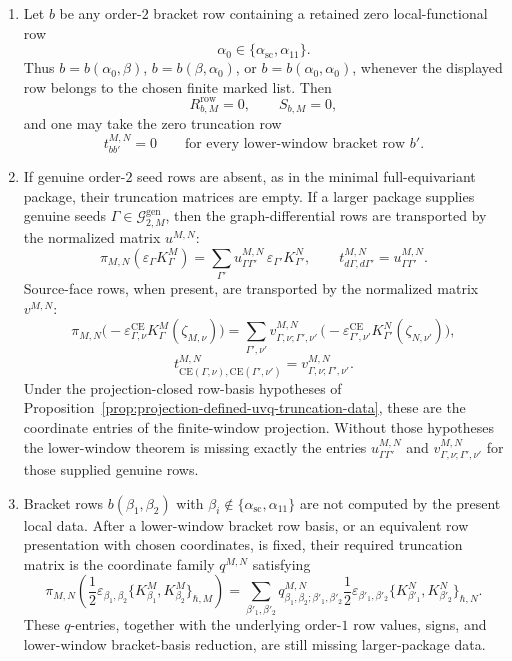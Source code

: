 \begin{prop}
\begin{enumerate}[label=(T\arabic*)]
    \item Let \(b\) be any order-\(2\) bracket row containing a retained
    zero local-functional row
    \[
      \alpha_0\in\{\alpha_{\mathrm{sc}},\alpha_{11}\}.
    \]
    Thus \(b=b(\alpha_0,\beta)\), \(b=b(\beta,\alpha_0)\), or
    \(b=b(\alpha_0,\alpha_0)\), whenever the displayed row belongs to the
    chosen finite marked list.  Then
    \[
      R^{\mathrm{row}}_{b,M}=0,\qquad S_{b,M}=0,
    \]
    and one may take the zero truncation row
    \[
      t^{M,N}_{bb'}=0
      \qquad
      \text{for every lower-window bracket row }b'.
    \]

    \item If genuine order-\(2\) seed rows are absent, as in the minimal
    full-equivariant package, their truncation matrices are empty.  If a
    larger package supplies genuine seeds
    \(\Gamma\in\mathcal G^{\mathrm{gen}}_{2,M}\), then the graph-differential
    rows are transported by the normalized matrix \(u^{M,N}\):
    \[
      \pi_{M,N}(\varepsilon_\Gamma K^M_\Gamma)
        =
      \sum_{\Gamma'}
        u^{M,N}_{\Gamma\Gamma'}\,
        \varepsilon_{\Gamma'}K^N_{\Gamma'},
      \qquad
      t^{M,N}_{d\Gamma,d\Gamma'}=u^{M,N}_{\Gamma\Gamma'}.
    \]
    Source-face rows, when present, are transported by the normalized matrix
    \(v^{M,N}\):
    \[
      \pi_{M,N}
      \bigl(-\varepsilon^{\mathrm{CE}}_{\Gamma,\nu}
      K^M_\Gamma(\zeta_{M,\nu})\bigr)
        =
      \sum_{\Gamma',\nu'}
        v^{M,N}_{\Gamma,\nu;\Gamma',\nu'}\,
        \bigl(-\varepsilon^{\mathrm{CE}}_{\Gamma',\nu'}
        K^N_{\Gamma'}(\zeta_{N,\nu'})\bigr),
    \]
    \[
      t^{M,N}_{\mathrm{CE}(\Gamma,\nu),
        \mathrm{CE}(\Gamma',\nu')}
        =
      v^{M,N}_{\Gamma,\nu;\Gamma',\nu'}.
    \]
    Under the projection-closed row-basis hypotheses of
    Proposition~\ref{prop:projection-defined-uvq-truncation-data}, these are
    the coordinate entries of the finite-window projection.  Without those
    hypotheses the lower-window theorem is missing exactly the entries
    \(u^{M,N}_{\Gamma\Gamma'}\) and
    \(v^{M,N}_{\Gamma,\nu;\Gamma',\nu'}\) for those supplied genuine rows.

    \item Bracket rows \(b(\beta_1,\beta_2)\) with
    \(\beta_i\notin\{\alpha_{\mathrm{sc}},\alpha_{11}\}\) are not computed
    by the present local data.  After a lower-window bracket row basis, or
    an equivalent row presentation with chosen coordinates, is fixed, their
    required truncation matrix is the coordinate family \(q^{M,N}\)
    satisfying
    \[
      \pi_{M,N}\!\left(
        \frac12\varepsilon_{\beta_1,\beta_2}
        \{K^M_{\beta_1},K^M_{\beta_2}\}_{\hbar,M}\right)
       =
      \sum_{\beta'_1,\beta'_2}
        q^{M,N}_{\beta_1,\beta_2;\beta'_1,\beta'_2}
        \frac12\varepsilon_{\beta'_1,\beta'_2}
        \{K^N_{\beta'_1},K^N_{\beta'_2}\}_{\hbar,N}.
    \]
    These \(q\)-entries, together with the underlying order-\(1\) row
    values, signs, and lower-window bracket-basis reduction, are still
    missing larger-package data.
  \end{enumerate}


\end{prop}
